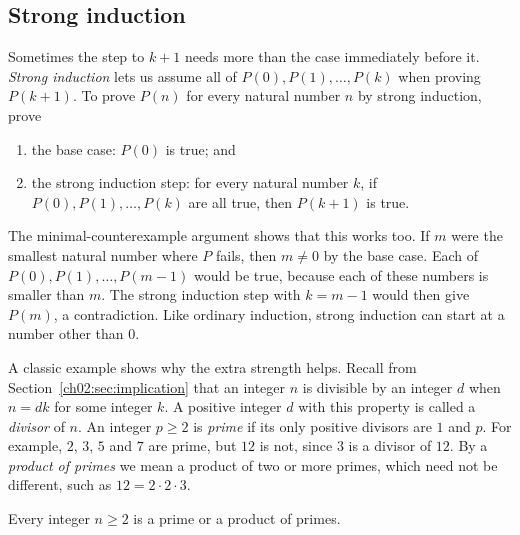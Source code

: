 \subsection*{Strong induction}
Sometimes the step to $k+1$ needs more than the case immediately before it. \emph{Strong induction} lets us assume all of $P(0),P(1),\ldots,P(k)$ when proving $P(k+1)$. To prove $P(n)$ for every natural number $n$ by strong induction, prove
\begin{enumerate}
\item the base case: $P(0)$ is true; and
\item the strong induction step: for every natural number $k$, if $P(0),P(1),\ldots,P(k)$ are all true, then $P(k+1)$ is true.
\end{enumerate}
The minimal-counterexample argument shows that this works too. If $m$ were the smallest natural number where $P$ fails, then $m\ne0$ by the base case. Each of $P(0),P(1),\ldots,P(m-1)$ would be true, because each of these numbers is smaller than $m$. The strong induction step with $k=m-1$ would then give $P(m)$, a contradiction. Like ordinary induction, strong induction can start at a number other than $0$.

A classic example shows why the extra strength helps. Recall from Section~\ref{ch02:sec:implication} that an integer $n$ is divisible by an integer $d$ when $n=dk$ for some integer $k$. A positive integer $d$ with this property is called a \emph{divisor} of $n$. An integer $p\ge2$ is \emph{prime} if its only positive divisors are $1$ and $p$. For example, $2$, $3$, $5$ and $7$ are prime, but $12$ is not, since $3$ is a divisor of $12$. By a \emph{product of primes} we mean a product of two or more primes, which need not be different, such as $12=2\cdot2\cdot3$.

\begin{proposition}\label{ch05:prop:prime-product}
Every integer $n\ge2$ is a prime or a product of primes.
\end{proposition}

